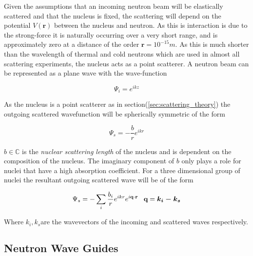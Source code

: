 Given the assumptions that an incoming neutron beam will be elastically scattered and that the nucleus is fixed, the scattering will depend on the potential $V(\textbf{r})$ between the nucleus and neutron. As this is interaction is due to the strong-force it is naturally occurring over a very short range, and is approximately zero at a distance of the order $\textbf{r}=10^{-15}m$. As this is much shorter than the wavelength of thermal and cold neutrons which are used in almost all scattering experiments, the nucleus acts as a point scatterer. A neutron beam can be represented as a plane wave with the wave-function

\begin{equation}
\Psi_i = e^{ikz}
\label{eq:neutronBeam}
\end{equation}

As the nucleus is a point scatterer as in section(\ref{sec:scattering_theory}) the outgoing scattered wavefunction will be spherically symmetric of the form 

\begin{equation}
\Psi_s = -\frac{b}{r}e^{ikr}
\label{eq:scatteredWave}
\end{equation}

$b \in \mathbb{C}$ is the \textit{nuclear scattering length} of the nucleus and is dependent on the composition of the nucleus. The imaginary component of $b$ only plays a role for nuclei that have a high absorption coefficient. For a three dimensional group of nuclei the resultant outgoing scattered wave will be of the form 

\begin{equation}
\Psi_s = -\sum \limits_i \frac{b_i}{r} e^{ikr} e^{i \textbf{q} \cdot \textbf{r}} \,\,\,\,\,  \textbf{q}= \mbox{\boldmath$k_i-k_s$}
\label{eq:latticeScatter}
\end{equation}

Where \mbox{\boldmath$k_i,k_s$}are the wavevectors of the incoming and scattered waves respectively. 

\subsection{Neutron Wave Guides}


